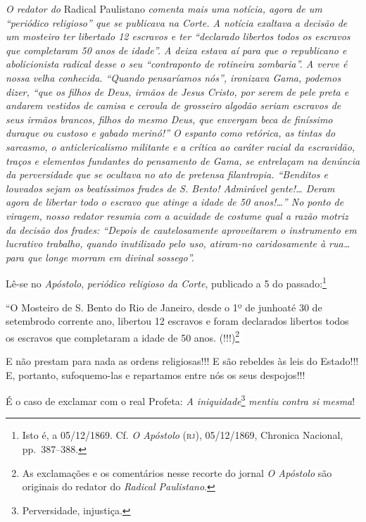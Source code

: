 \begin{didascalia}
\emph{O redator do} Radical Paulistano \emph{comenta mais uma notícia,
agora de um ``periódico religioso'' que se publicava na Corte. A notícia
exaltava a decisão de um mosteiro ter libertado 12 escravos e ter
``declarado libertos todos os escravos que completaram 50 anos de idade''.
A deixa estava aí para que o republicano e abolicionista radical desse o
seu ``contraponto de rotineira zombaria''. A verve é nossa velha
conhecida. ``Quando pensaríamos nós'', ironizava Gama, podemos dizer, ``que
os filhos de Deus, irmãos de Jesus Cristo, por serem de pele preta e
andarem vestidos de camisa e ceroula de grosseiro algodão seriam
escravos de seus irmãos brancos, filhos do mesmo Deus, que envergam beca
de finíssimo duraque ou custoso e gabado merinó!'' O espanto como
retórica, as tintas do sarcasmo, o anticlericalismo militante e a
crítica ao caráter racial da escravidão, traços e elementos fundantes do
pensamento de Gama, se entrelaçam na denúncia da perversidade que se
ocultava no ato de pretensa filantropia. ``Benditos e louvados sejam os
beatíssimos frades de S. Bento! Admirável gente!\ldots{} Deram agora de
libertar todo o escravo que atinge a idade de 50 anos!\ldots{}'' No ponto de
viragem, nosso redator resumia com a acuidade de costume qual a razão
motriz da decisão dos frades: ``Depois de cautelosamente aproveitarem o
instrumento em lucrativo trabalho, quando inutilizado pelo uso,
atiram-no caridosamente à rua\ldots{} para que longe morram em divinal
sossego''.}
\end{didascalia}


Lê-se no \emph{Apóstolo}, \emph{periódico religioso da Corte}, publicado
a 5 do passado:\footnote{ Isto é, a 05/12/1869. Cf. \emph{O Apóstolo}
  (\textsc{rj}), 05/12/1869, Chronica Nacional, pp.~387--388.}

``O Mosteiro de S. Bento do Rio de Janeiro, desde o 1º de junhoaté 30 de
setembrodo corrente ano, libertou 12 escravos e foram declarados
libertos todos os escravos que completaram a idade de 50 anos.
(!!!)\footnote{ As exclamações e os comentários nesse recorte do jornal
  \emph{O Apóstolo} são originais do redator do \emph{Radical
  Paulistano}.}

E não prestam para nada as ordens religiosas!!! E são rebeldes às leis
do Estado!!! E, portanto, sufoquemo-las e repartamos entre nós os seus
despojos!!!

É o caso de exclamar com o real Profeta: \emph{A iniquidade}\footnote{
  Perversidade, injustiça.} \emph{mentiu contra si mesma}!


